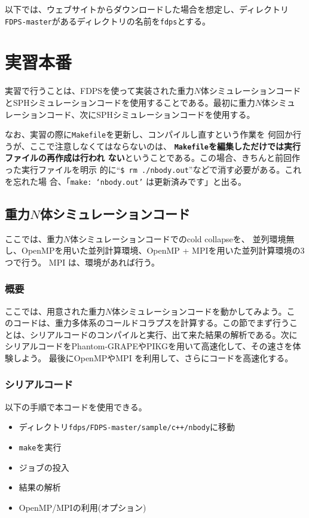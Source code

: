 \documentclass[12pt,a4paper,dvipdfmx]{jarticle}
\begin{document}
以下では、ウェブサイトからダウンロードした場合を想定し、ディレクトリ\texttt{FDPS-master}があるディレクトリの名前を\texttt{fdps}とする。

\section{実習本番}

実習で行うことは、FDPSを使って実装された重力$N$体シミュレーションコード
とSPHシミュレーションコードを使用することである。最初に重力$N$体シミュ
レーションコード、次にSPHシミュレーションコードを使用する。

なお、実習の際に\texttt{Makefile}を更新し、コンパイルし直すという作業を
何回か行うが、ここで注意しなくてはならないのは、
\textbf{\texttt{Makefile}を編集しただけでは実行ファイルの再作成は行われ
  ない}ということである。この場合、きちんと前回作った実行ファイルを明示
的に``\texttt{\$ rm ./nbody.out}''などで消す必要がある。これを忘れた場
合、「\texttt{make: `nbody.out'} は更新済みです」と出る。

\subsection{重力$N$体シミュレーションコード}
ここでは、重力$N$体シミュレーションコードでのcold collapseを、
並列環境無し、OpenMPを用いた並列計算環境、OpenMP + MPIを用いた並列計算環境の3つで行う。
MPI は、環境があれば行う。


\subsubsection{概要}

ここでは、用意された重力$N$体シミュレーションコードを動かしてみよう。こ
のコードは、重力多体系のコールドコラプスを計算する。この節でまず行うこ
とは、シリアルコードのコンパイルと実行、出て来た結果の解析である。次に
シリアルコードをPhantom-GRAPEやPIKGを用いて高速化して、その速さを体験しよう。
最後にOpenMPやMPI を利用して、さらにコードを高速化する。

\subsubsection{シリアルコード}

以下の手順で本コードを使用できる。
\begin{itemize}
\item ディレクトリ\texttt{fdps/FDPS-master/sample/c++/nbody}に移動
\item \texttt{make}を実行
\item ジョブの投入
\item 結果の解析
\item OpenMP/MPIの利用(オプション)
\end{itemize}
\end{document}
